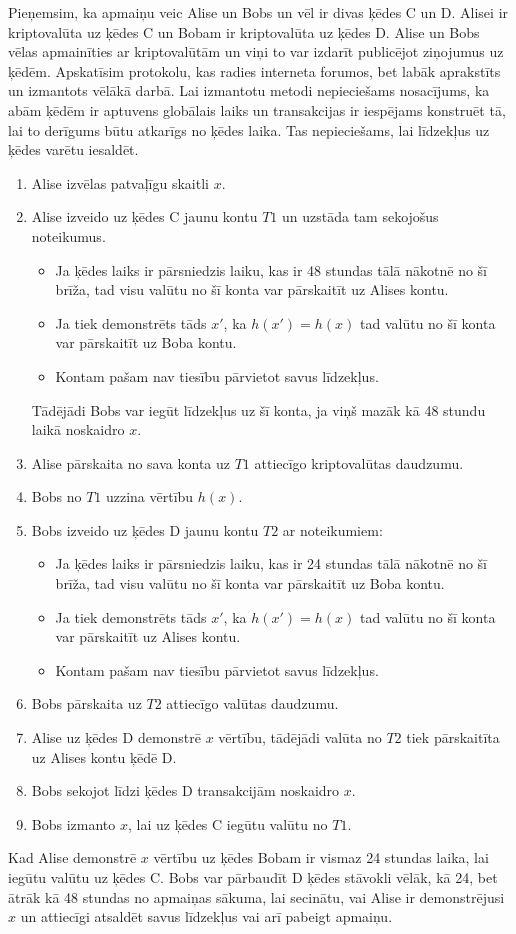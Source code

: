 Pieņemsim, ka apmaiņu veic Alise un Bobs un vēl ir divas ķēdes C un D. Alisei ir kriptovalūta uz ķēdes C un Bobam ir kriptovalūta uz ķēdes D. Alise un Bobs vēlas apmainīties ar kriptovalūtām un viņi to var izdarīt publicējot ziņojumus uz ķēdēm. Apskatīsim protokolu, kas radies interneta forumos\cite{nolan13}, bet labāk aprakstīts un izmantots vēlākā darbā\cite{back14}. Lai izmantotu metodi nepieciešams nosacījums, ka abām ķēdēm ir aptuvens globālais laiks un transakcijas ir iespējams konstruēt tā, lai to derīgums būtu atkarīgs no ķēdes laika. Tas nepieciešams, lai līdzekļus uz ķēdes varētu iesaldēt.
\begin{enumerate}
    \item Alise izvēlas patvaļīgu skaitli $x$.
    \item Alise izveido uz ķēdes C jaunu kontu $T1$ un uzstāda tam sekojošus noteikumus.
        \begin{itemize}
            \item Ja ķēdes laiks ir pārsniedzis laiku, kas ir 48 stundas tālā nākotnē no šī brīža, tad visu valūtu no šī konta var pārskaitīt uz Alises kontu.
            \item Ja tiek demonstrēts tāds $x'$, ka $h(x') = h(x)$ tad valūtu no šī konta var pārskaitīt uz Boba kontu.
            \item Kontam pašam nav tiesību pārvietot savus līdzekļus.
        \end{itemize}
        Tādējādi Bobs var iegūt līdzekļus uz šī konta, ja viņš mazāk kā 48 stundu laikā noskaidro $x$.
    \item Alise pārskaita no sava konta uz $T1$ attiecīgo kriptovalūtas daudzumu.
    \item Bobs no $T1$ uzzina vērtību $h(x)$.
    \item Bobs izveido uz ķēdes D jaunu kontu $T2$ ar noteikumiem:
        \begin{itemize}
            \item Ja ķēdes laiks ir pārsniedzis laiku, kas ir 24 stundas tālā nākotnē no šī brīža, tad visu valūtu no šī konta var pārskaitīt uz Boba kontu.
            \item Ja tiek demonstrēts tāds $x'$, ka $h(x') = h(x)$ tad valūtu no šī konta var pārskaitīt uz Alises kontu.
            \item Kontam pašam nav tiesību pārvietot savus līdzekļus.
        \end{itemize}
    \item Bobs pārskaita uz $T2$ attiecīgo valūtas daudzumu.
    \item Alise uz ķēdes D demonstrē $x$ vērtību, tādējādi valūta no $T2$ tiek pārskaitīta uz Alises kontu ķēdē D.
    \item Bobs sekojot līdzi ķēdes D transakcijām noskaidro $x$.
    \item Bobs izmanto $x$, lai uz ķēdes C iegūtu valūtu no $T1$.
\end{enumerate}
Kad Alise demonstrē $x$ vērtību uz ķēdes Bobam ir vismaz 24 stundas laika, lai iegūtu valūtu uz ķēdes C.
Bobs var pārbaudīt D ķēdes stāvokli vēlāk, kā 24, bet ātrāk kā 48 stundas no apmaiņas sākuma, lai secinātu, vai Alise ir demonstrējusi $x$ un attiecīgi atsaldēt savus līdzekļus vai arī pabeigt apmaiņu.

